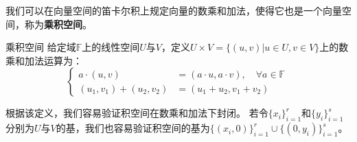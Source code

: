 
\begin{issues}
\issueTODO
\end{issues}


我们可以在向量空间的笛卡尔积上规定向量的数乘和加法，使得它也是一个向量空间，称为\textbf{乘积空间}。

\begin{definition}{乘积空间}
给定域$\mathbb F $上的线性空间$U$与$V$，定义$U\times V=\{(u, v)|u \in U, v \in V\}$上的数乘和加法运算为：
\begin{equation}
\left\{\begin{aligned}
a \cdot (u, v) &= (a \cdot u, a \cdot v), \quad \forall a \in \mathbb F\\
(u_1, v_1) + (u_2, v_2) &= (u_1 + u_2, v_1 + v_2)
\end{aligned}\right.~
\end{equation}
\end{definition}
根据该定义，我们容易验证积空间在数乘和加法下封闭。
若令$\{x_i\}^r_{i=1}$和$\{y_i\}^s_{i=1}$分别为$U$与$V$的基，我们也容易验证积空间的基为$\{(x_i, 0)\}^r_{i=1}\cup \{(0, y_i)\}^s_{i=1}$。

% 



